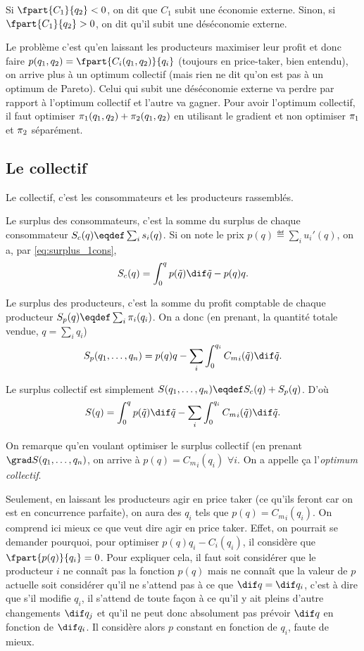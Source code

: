 Si $\fpart{C_1}{q_2} < 0$, on dit que $C_1$ subit une économie externe.
Sinon, si $\fpart{C_1}{q_2} > 0$, on dit qu'il subit une déséconomie
externe.

Le problème c'est qu'en laissant les producteurs maximiser leur profit
et donc faire $p(q_1, q_2) = \fpart{C_i(q_1, q_2)}{q_i}$
(toujours en price-taker, bien entendu),
on arrive plus à un optimum collectif
(mais rien ne dit qu'on est pas à un optimum de Pareto).
Celui qui subit une déséconomie externe va perdre par rapport à l'optimum
collectif et l'autre va gagner.
Pour avoir l'optimum collectif,
il faut optimiser $\pi_1(q_1, q_2) + \pi_2(q_1, q_2)$
en utilisant le gradient et
non optimiser $\pi_1$ et $\pi_2$ séparément.

\subsection{Le collectif}
Le collectif, c'est les consommateurs et les producteurs rassemblés.

Le surplus des consommateurs, c'est la somme du surplus de chaque consommateur
$\surpluscons(q) \eqdef \sum_i s_i(q)$.
Si on note le prix $p(q) \eqdef \sum_i u_i'(q)$, on a, par \eqref{eq:surplus_1cons},
\[ \surpluscons(q) = \int_0^{q}p(\tilde{q}) \dif \tilde{q} - p(q) q. \]

Le surplus des producteurs, c'est la somme du profit comptable de chaque
producteur
$\surplusprod(q) \eqdef \sum_i \pcompt_i(q_i)$.
On a donc (en prenant, la quantité totale vendue, $q = \sum_i q_i$)
\[ \surplusprod(q_1, \ldots, q_n) = p(q)q -
\sum_i \int_0^{q_i} {C_m}_i(\tilde{q}) \dif \tilde{q}. \]

Le surplus collectif est simplement
$\surpluscoll(q_1, \ldots, q_n)
\eqdef \surpluscons(q) + \surplusprod(q)$.
D'où
\[ \surpluscoll(q) = \int_0^{q}p(\tilde{q}) \dif \tilde{q}
- \sum_i \int_0^{q_i} {C_m}_i(\tilde{q}) \dif \tilde{q}. \]

On remarque qu'en voulant optimiser le surplus collectif
(en prenant $\grad \surpluscoll(q_1, \ldots, q_n)$,
on arrive à $p(q) = {C_m}_i(q_i)$ $\forall i$.
On a appelle ça l'\emph{optimum collectif}.

Seulement, en laissant les producteurs agir en price taker
(ce qu'ils feront car on est en concurrence parfaite),
on aura des $q_i$ tels que $p(q) = {C_m}_i(q_i)$.
On comprend ici mieux ce que veut dire agir en price taker.
Effet, on pourrait se demander pourquoi, pour optimiser
$p(q)q_i - {C}_i(q_i)$, il considère que $\fpart{p(q)}{q_i} = 0$.
Pour expliquer cela,
il faut soit considérer que le producteur $i$ ne connaît pas la fonction $p(q)$
mais ne connaît que la valeur de $p$ actuelle soit considérer qu'il
ne s'attend pas à ce que $\dif q = \dif q_i$, c'est à dire que s'il modifie
$q_i$, il s'attend de toute façon à ce qu'il y ait pleins d'autre changements
$\dif q_j$ et qu'il ne peut donc absolument pas prévoir $\dif q$ en fonction
de $\dif q_i$. Il considère alors $p$ constant en fonction de $q_i$,
faute de mieux.

